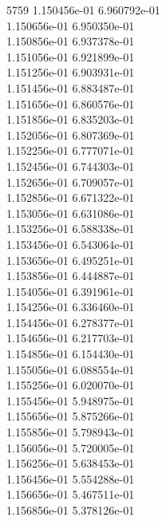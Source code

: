 5759	1.150456e-01	6.960792e-01	\\ 	1.150656e-01	6.950350e-01	\\ 	1.150856e-01	6.937378e-01	\\ 	1.151056e-01	6.921899e-01	\\ 	1.151256e-01	6.903931e-01	\\ 	1.151456e-01	6.883487e-01	\\ 	1.151656e-01	6.860576e-01	\\ 	1.151856e-01	6.835203e-01	\\ 	1.152056e-01	6.807369e-01	\\ 	1.152256e-01	6.777071e-01	\\ 	1.152456e-01	6.744303e-01	\\ 	1.152656e-01	6.709057e-01	\\ 	1.152856e-01	6.671322e-01	\\ 	1.153056e-01	6.631086e-01	\\ 	1.153256e-01	6.588338e-01	\\ 	1.153456e-01	6.543064e-01	\\ 	1.153656e-01	6.495251e-01	\\ 	1.153856e-01	6.444887e-01	\\ 	1.154056e-01	6.391961e-01	\\ 	1.154256e-01	6.336460e-01	\\ 	1.154456e-01	6.278377e-01	\\ 	1.154656e-01	6.217703e-01	\\ 	1.154856e-01	6.154430e-01	\\ 	1.155056e-01	6.088554e-01	\\ 	1.155256e-01	6.020070e-01	\\ 	1.155456e-01	5.948975e-01	\\ 	1.155656e-01	5.875266e-01	\\ 	1.155856e-01	5.798943e-01	\\ 	1.156056e-01	5.720005e-01	\\ 	1.156256e-01	5.638453e-01	\\ 	1.156456e-01	5.554288e-01	\\ 	1.156656e-01	5.467511e-01	\\ 	1.156856e-01	5.378126e-01	\\ \hline
